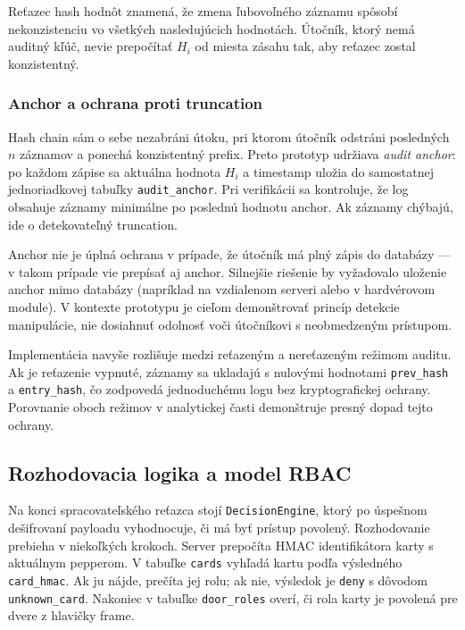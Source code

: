 \documentclass[journal,a4paper,onecolumn]{IEEEtran}
\begin{document}
Reťazec hash hodnôt znamená, že zmena ľubovoľného záznamu spôsobí nekonzistenciu vo všetkých nasledujúcich hodnotách. Útočník, ktorý nemá auditný kľúč, nevie prepočítať $H_i$ od miesta zásahu tak, aby reťazec zostal konzistentný.

\subsubsection{Anchor a ochrana proti truncation}

Hash chain sám o sebe nezabráni útoku, pri ktorom útočník odstráni posledných $n$ záznamov a ponechá konzistentný prefix. Preto prototyp udržiava \emph{audit anchor}: po každom zápise sa aktuálna hodnota $H_i$ a timestamp uložia do samostatnej jednoriadkovej tabuľky \texttt{audit\_anchor}. Pri verifikácii sa kontroluje, že log obsahuje záznamy minimálne po poslednú hodnotu anchor. Ak záznamy chýbajú, ide o detekovateľný truncation\cite{SchneierKelsey1999,NIST80092}.

Anchor nie je úplná ochrana v prípade, že útočník má plný zápis do databázy --- v takom prípade vie prepísať aj anchor. Silnejšie riešenie by vyžadovalo uloženie anchor mimo databázy (napríklad na vzdialenom serveri alebo v hardvérovom module). V kontexte prototypu je cieľom demonštrovať princíp detekcie manipulácie, nie dosiahnuť odolnosť voči útočníkovi s neobmedzeným prístupom.

Implementácia navyše rozlišuje medzi reťazeným a nereťazeným režimom auditu. Ak je reťazenie vypnuté, záznamy sa ukladajú s nulovými hodnotami \texttt{prev\_hash} a \texttt{entry\_hash}, čo zodpovedá jednoduchému logu bez kryptografickej ochrany. Porovnanie oboch režimov v analytickej časti demonštruje presný dopad tejto ochrany.

\subsection{Rozhodovacia logika a model RBAC}

Na konci spracovateľského reťazca stojí \texttt{DecisionEngine}, ktorý po úspešnom dešifrovaní payloadu vyhodnocuje, či má byť prístup povolený. Rozhodovanie prebieha v niekoľkých krokoch. Server prepočíta HMAC identifikátora karty s aktuálnym pepperom. V tabuľke \texttt{cards} vyhľadá kartu podľa výsledného \texttt{card\_hmac}. Ak ju nájde, prečíta jej rolu; ak nie, výsledok je \texttt{deny} s dôvodom \texttt{unknown\_card}. Nakoniec v tabuľke \texttt{door\_roles} overí, či rola karty je povolená pre dvere z hlavičky frame\cite{NISTRBACModel,SandhuRBAC1996}.
\end{document}
